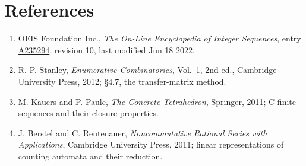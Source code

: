 \documentclass[11pt]{article}
\theoremstyle{definition}
\begin{document}
\section{References}

\begin{enumerate}

\item OEIS Foundation Inc., \emph{The On-Line Encyclopedia of Integer Sequences}, entry \href{https://oeis.org/A235294}{A235294}, revision 10, last modified Jun 18 2022.

\item R. P. Stanley, \emph{Enumerative Combinatorics}, Vol.~1, 2nd ed., Cambridge University Press, 2012; \S4.7, the transfer-matrix method.

\item M. Kauers and P. Paule, \emph{The Concrete Tetrahedron}, Springer, 2011; C-finite sequences and their closure properties.

\item J. Berstel and C. Reutenauer, \emph{Noncommutative Rational Series with Applications}, Cambridge University Press, 2011; linear representations of counting automata and their reduction.

\end{enumerate}
\end{document}
